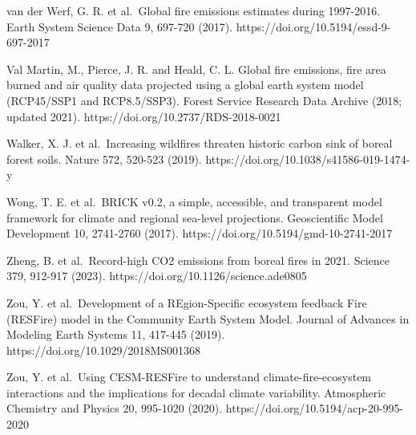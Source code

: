 \documentclass[12pt]{article}
\begin{document}
van der Werf, G. R. et al.~Global fire emissions estimates during
1997-2016. Earth System Science Data 9, 697-720 (2017).
https://doi.org/10.5194/essd-9-697-2017

Val Martin, M., Pierce, J. R. and Heald, C. L. Global fire emissions,
fire area burned and air quality data projected using a global earth
system model (RCP45/SSP1 and RCP8.5/SSP3). Forest Service Research Data
Archive (2018; updated 2021). https://doi.org/10.2737/RDS-2018-0021

Walker, X. J. et al.~Increasing wildfires threaten historic carbon sink
of boreal forest soils. Nature 572, 520-523 (2019).
https://doi.org/10.1038/s41586-019-1474-y

Wong, T. E. et al.~BRICK v0.2, a simple, accessible, and transparent
model framework for climate and regional sea-level projections.
Geoscientific Model Development 10, 2741-2760 (2017).
https://doi.org/10.5194/gmd-10-2741-2017

Zheng, B. et al.~Record-high CO2 emissions from boreal fires in 2021.
Science 379, 912-917 (2023). https://doi.org/10.1126/science.ade0805

Zou, Y. et al.~Development of a REgion-Specific ecosystem feedback Fire
(RESFire) model in the Community Earth System Model. Journal of Advances
in Modeling Earth Systems 11, 417-445 (2019).
https://doi.org/10.1029/2018MS001368

Zou, Y. et al.~Using CESM-RESFire to understand climate-fire-ecosystem
interactions and the implications for decadal climate variability.
Atmospheric Chemistry and Physics 20, 995-1020 (2020).
https://doi.org/10.5194/acp-20-995-2020
\end{document}

